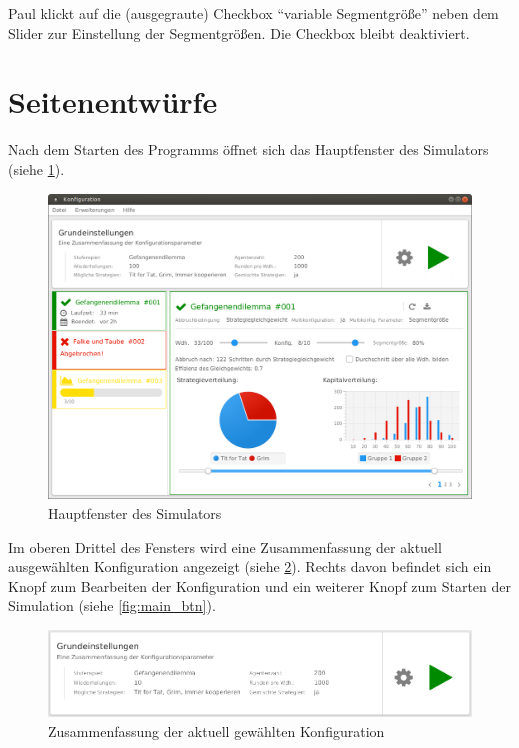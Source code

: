 \documentclass[parskip=full,11pt]{scrartcl}
\begin{document}
{Paul klickt auf die (ausgegraute) Checkbox \enquote{variable Segmentgröße} neben dem Slider zur Einstellung der Segmentgrößen.}
{Die Checkbox bleibt deaktiviert.}

\appendix
\newpage
\section{Seitenentwürfe}

Nach dem Starten des Programms öffnet sich das Hauptfenster des Simulators \\(siehe \cref{fig:home}).

\begin{figure}[hb]
	\includegraphics[width=\textwidth]{images/home.png}
	\caption{\label{fig:home}
		Hauptfenster des Simulators}
\end{figure}

Im oberen Drittel des Fensters wird eine Zusammenfassung der aktuell ausgewählten \Gls{Konfiguration} angezeigt (siehe \cref{fig:home_top}). Rechts davon befindet sich ein Knopf zum Bearbeiten der \Gls{Konfiguration} und ein weiterer Knopf zum Starten der Simulation (siehe \cref{fig:main_btn}).

\begin{figure}[hb]
	\centering
	\includegraphics[width=\textwidth]{images/home_top.png}
	\caption{\label{fig:home_top}
	Zusammenfassung der aktuell gewählten \Gls{Konfiguration}}
\end{figure}
\end{document}
